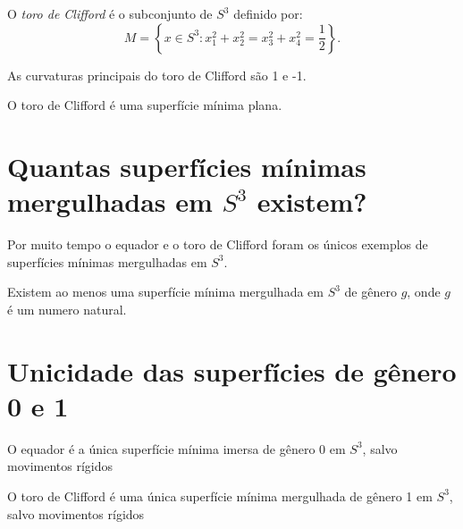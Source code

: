 \begin{definicao}
	O \emph{toro de Clifford} é o subconjunto de $S^3$ definido por:
	\begin{equation*}
		M = \left\{ x \in S^3: x_1^2 + x_2^2 = x_3^2 + x_4^2 = \frac{1}{2} \right\}.
	\end{equation*}
\end{definicao}

\begin{proposicao}
	As curvaturas principais do toro de Clifford são 1 e -1.
\end{proposicao}

\begin{proposicao}
	O toro de Clifford é uma superfície mínima plana.
\end{proposicao}

\section{Quantas superfícies mínimas mergulhadas em $S^3$ existem?}

\begin{observacao}
	Por muito tempo o equador e o toro de Clifford foram os únicos exemplos de superfícies mínimas mergulhadas em $S^3$.
\end{observacao}

\begin{teorema}[Lawson]
	Existem ao menos uma superfície mínima mergulhada em $S^3$ de gênero $g$, onde $g$ é um numero natural.
\end{teorema}


\section{Unicidade das superfícies de gênero 0 e 1}

\begin{teorema}[Almgren]
	O equador é a única superfície mínima imersa de gênero 0 em $S^3$, salvo movimentos rígidos
\end{teorema}

\begin{observacao}
	O toro de Clifford é uma única superfície mínima mergulhada de gênero 1 em $S^3$, salvo movimentos rígidos
\end{observacao}